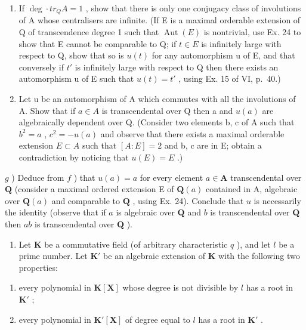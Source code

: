 \begin{enumerate}
\item
  If \(\deg \cdot tr_{Q}A = 1\) , show that there is only one conjugacy class of involutions of A whose centralisers are infinite. (If E is a maximal orderable extension of Q of transcendence degree 1 such that \(\operatorname{Aut}(E)\) is nontrivial, use Ex. 24 to show that E cannot be comparable to Q; if \(t \in E\) is infinitely large with respect to Q, show that so is \(u(t)\) for any automorphism u of E, and that conversely if \(t'\) is infinitely large with respect to Q then there exists an automorphism u of E such that \(u(t) = t'\) , using Ex. 15 of VI, p.~40.)
\item
  Let u be an automorphism of A which commutes with all the involutions of A. Show that if \(a \in A\) is transcendental over Q then a and \(u(a)\) are algebraically dependent over Q. (Consider two elements b, c of A such that \(b^{2} = a\) , \(c^{2} = -u(a)\) and observe that there exists a maximal orderable extension \(E \subset A\) such that \([A : E] = 2\) and b, c are in E; obtain a contradiction by noticing that \(u(E) = E\) .)
\end{enumerate}

\(g\) ) Deduce from \(f\) ) that \(u(a) = a\) for every element \(a \in \mathbf{A}\) transcendental over \(\mathbf{Q}\) (consider a maximal ordered extension E of \(\mathbf{Q}(a)\) contained in A, algebraic over \(\mathbf{Q}(a)\) and comparable to \(\mathbf{Q}\) , using Ex. 24). Conclude that \(u\) is necessarily the identity (observe that if \(a\) is algebraic over \(\mathbf{Q}\) and \(b\) is transcendental over \(\mathbf{Q}\) then \(ab\) is transcendental over \(\mathbf{Q}\) ).

\begin{enumerate}
\def\labelenumi{\arabic{enumi})}
\setcounter{enumi}{32}
\tightlist
\item
  Let \(\mathbf{K}\) be a commutative field (of arbitrary characteristic \(q\) ), and let \(l\) be a prime number. Let \(\mathbf{K}'\) be an algebraic extension of \(\mathbf{K}\) with the following two properties:
\end{enumerate}

\begin{enumerate}
\def\labelenumi{(\roman{enumi})}
\item
  every polynomial in \(\mathbf{K}[\mathbf{X}]\) whose degree is not divisible by \(l\) has a root in \(\mathbf{K}'\) ;
\item
  every polynomial in \(\mathbf{K}'[\mathbf{X}]\) of degree equal to \(l\) has a root in \(\mathbf{K}'\) .
\end{enumerate}

